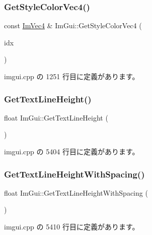 \subsubsection{\texorpdfstring{Get\+Style\+Color\+Vec4()}{GetStyleColorVec4()}}
{\footnotesize\ttfamily const \mbox{\hyperlink{struct_im_vec4}{Im\+Vec4}} \& Im\+Gui\+::\+Get\+Style\+Color\+Vec4 (\begin{DoxyParamCaption}\item[{\mbox{\hyperlink{imgui_8h_a1b0467ec582e731ae6292fef726fb5fe}{Im\+Gui\+Col}}}]{idx }\end{DoxyParamCaption})}



 imgui.\+cpp の 1251 行目に定義があります。

\mbox{\label{namespace_im_gui_aaba5637199d31ea23d4d143b30a44aff}} 
\subsubsection{\texorpdfstring{Get\+Text\+Line\+Height()}{GetTextLineHeight()}}
{\footnotesize\ttfamily float Im\+Gui\+::\+Get\+Text\+Line\+Height (\begin{DoxyParamCaption}{ }\end{DoxyParamCaption})}



 imgui.\+cpp の 5404 行目に定義があります。

\mbox{\label{namespace_im_gui_aa1616f6082fd210fde8d98c511bf8f56}} 
\subsubsection{\texorpdfstring{Get\+Text\+Line\+Height\+With\+Spacing()}{GetTextLineHeightWithSpacing()}}
{\footnotesize\ttfamily float Im\+Gui\+::\+Get\+Text\+Line\+Height\+With\+Spacing (\begin{DoxyParamCaption}{ }\end{DoxyParamCaption})}



 imgui.\+cpp の 5410 行目に定義があります。


